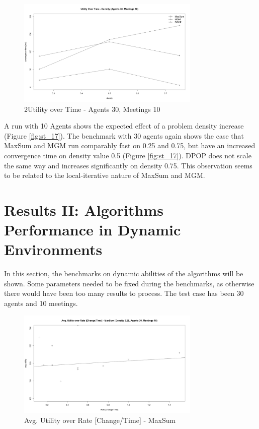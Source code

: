 \begin{figure}[H]
\centering
\includegraphics[width=330px]{graphics/experiments/static/st_18}
\caption{2Utility over Time - Agents 30, Meetings 10}
\label{fig:st_18}
\end{figure}

A run with 10 Agents shows the expected effect of a problem density increase (Figure \ref{fig:st_17}). The benchmark with 30 agents again shows the case that MaxSum and MGM run comparably fast on 0.25 and 0.75, but have an increased convergence time on density value 0.5 (Figure \ref{fig:st_17}). DPOP does not scale the same way and increases significantly on density 0.75. This observation seems to be related to the local-iterative nature of MaxSum and MGM.


\section{Results II: Algorithms Performance in Dynamic Environments}

In this section, the benchmarks on dynamic abilities of the algorithms will be shown. Some parameters needed to be fixed during the benchmarks, as otherwise there would have been too many results to process. The test case has been 30 agents and 10 meetings.

\begin{figure}[H]
\centering
\includegraphics[width=330px]{graphics/experiments/dynamic/d_1.png}
\caption{Avg. Utility over Rate [Change/Time] - MaxSum}
\label{fig:d_1}
\end{figure}

